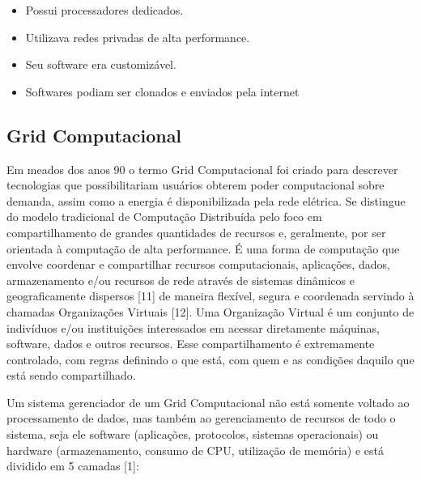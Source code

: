 \begin{itemize}
    \item Possui processadores dedicados.
    \item Utilizava redes privadas de alta performance.
    \item Seu software era customizável.
    \item Softwares podiam ser clonados e enviados pela internet
\end{itemize}

\subsection{Grid Computacional} \label{cap2sec1subsec2}

Em meados dos anos 90 o termo Grid Computacional foi criado para descrever tecnologias que possibilitariam usuários obterem poder computacional sobre demanda, assim como a energia é disponibilizada pela rede elétrica. Se distingue do modelo tradicional de Computação Distribuída pelo foco em compartilhamento de grandes quantidades de recursos e, geralmente, por ser orientada à computação de alta performance. É uma forma de computação que envolve coordenar e compartilhar recursos computacionais, aplicações, dados, armazenamento e/ou recursos de rede através de sistemas dinâmicos e geograficamente dispersos [11] de maneira flexível, segura e coordenada servindo à chamadas Organizações Virtuais [12]. Uma Organização Virtual é um conjunto de indivíduos e/ou instituições interessados em acessar diretamente máquinas, software, dados e outros recursos. Esse compartilhamento é extremamente controlado, com regras definindo o que está, com quem e as condições daquilo que está sendo compartilhado.

Um sistema gerenciador de um Grid Computacional não está somente voltado ao processamento de dados, mas também ao gerenciamento de recursos de todo o sistema, seja ele software (aplicações, protocolos, sistemas operacionais) ou hardware (armazenamento, consumo de CPU, utilização de memória) e está dividido em 5 camadas [1]: 

